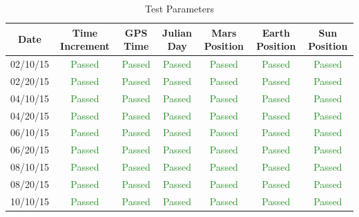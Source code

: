 \documentclass[]{BasiliskReportMemo}
\begin{document}
\begin{table}[htbp]
    \caption{Test Parameters}
   \label{tab:parameters}
        \centering \fontsize{10}{10}\selectfont
   \begin{tabular}{c | c | c | c | c | c | c} %
      \hline
      Date   & Time Increment &GPS Time& Julian Day & Mars Position & Earth Position & Sun Position \\
      \hline
      02/10/15 & \textcolor{ForestGreen}{Passed} & \textcolor{ForestGreen}{Passed} &  \textcolor{ForestGreen}{Passed}&  \textcolor{ForestGreen}{Passed} & \textcolor{ForestGreen}{Passed} &  \textcolor{ForestGreen}{Passed}\\
      02/20/15 & \textcolor{ForestGreen}{Passed} & \textcolor{ForestGreen}{Passed} &  \textcolor{ForestGreen}{Passed}&  \textcolor{ForestGreen}{Passed} & \textcolor{ForestGreen}{Passed} &  \textcolor{ForestGreen}{Passed}\\
      04/10/15 & \textcolor{ForestGreen}{Passed} & \textcolor{ForestGreen}{Passed} &  \textcolor{ForestGreen}{Passed}&  \textcolor{ForestGreen}{Passed} & \textcolor{ForestGreen}{Passed} &  \textcolor{ForestGreen}{Passed}\\
      04/20/15 & \textcolor{ForestGreen}{Passed} & \textcolor{ForestGreen}{Passed} &  \textcolor{ForestGreen}{Passed}&  \textcolor{ForestGreen}{Passed} & \textcolor{ForestGreen}{Passed} &  \textcolor{ForestGreen}{Passed}\\
      06/10/15 & \textcolor{ForestGreen}{Passed} & \textcolor{ForestGreen}{Passed} &  \textcolor{ForestGreen}{Passed}&  \textcolor{ForestGreen}{Passed} & \textcolor{ForestGreen}{Passed} &  \textcolor{ForestGreen}{Passed}\\
      06/20/15 & \textcolor{ForestGreen}{Passed} & \textcolor{ForestGreen}{Passed} &  \textcolor{ForestGreen}{Passed}&  \textcolor{ForestGreen}{Passed} & \textcolor{ForestGreen}{Passed} &  \textcolor{ForestGreen}{Passed}\\
      08/10/15 & \textcolor{ForestGreen}{Passed} & \textcolor{ForestGreen}{Passed} &  \textcolor{ForestGreen}{Passed}&  \textcolor{ForestGreen}{Passed} & \textcolor{ForestGreen}{Passed} &  \textcolor{ForestGreen}{Passed}\\
      08/20/15 & \textcolor{ForestGreen}{Passed} & \textcolor{ForestGreen}{Passed} &  \textcolor{ForestGreen}{Passed}&  \textcolor{ForestGreen}{Passed} & \textcolor{ForestGreen}{Passed} &  \textcolor{ForestGreen}{Passed}\\
      10/10/15 & \textcolor{ForestGreen}{Passed} & \textcolor{ForestGreen}{Passed} &  \textcolor{ForestGreen}{Passed}&  \textcolor{ForestGreen}{Passed} & \textcolor{ForestGreen}{Passed} &  \textcolor{ForestGreen}{Passed}\\

\end{tabular}
\end{table}
\end{document}

